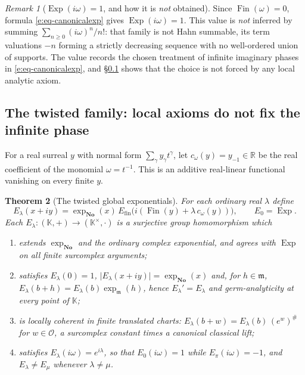 \documentclass[11pt,a4paper]{article}
\numberwithin{equation}{section}
\newtheorem{theorem}{Theorem}[section]
\theoremstyle{definition}
\theoremstyle{remark}
\newtheorem{remark}[theorem]{Remark}
\theoremstyle{plain}
\newcommand{\K}{\mathbb K}
\newcommand{\No}{\mathbf{No}}
\newcommand{\RR}{\mathbb R}
\newcommand{\Ov}{\mathcal O}
\newcommand{\mm}{\mathfrak m}
\DeclareMathOperator{\Exp}{Exp}
\newcommand{\tm}{t}
\newcommand{\ev}[1]{#1^{\#}}
\newcommand{\abs}[1]{\lvert #1\rvert}
\begin{document}
\begin{remark}[$\Exp(i\omega)=1$, and how it is \emph{not} obtained]
\label{e:rem-iomega}
Since $\operatorname{Fin}(\omega)=0$, formula
\eqref{e:eq-canonicalexp} gives $\Exp(i\omega)=1$.  This value is
\emph{not} inferred by summing $\sum_{n\ge0}(i\omega)^n/n!$: that family is
not Hahn summable, its term valuations $-n$ forming a strictly decreasing
sequence with no well-ordered union of supports.  The value records the
chosen treatment of infinite imaginary phases in
\eqref{e:eq-canonicalexp}, and \S\ref{e:sec-twisted} shows that the choice
is not forced by any local analytic axiom.
\end{remark}

\subsection{The twisted family: local axioms do not fix the infinite phase}
\label{e:sec-twisted}

For a real surreal $y$ with normal form $\sum_\gamma y_\gamma\tm^{\gamma}$,
let $c_\omega(y)=y_{-1}\in\RR$ be the real coefficient of the monomial
$\omega=\tm^{-1}$.  This is an additive real-linear functional vanishing on
every finite $y$.

\begin{theorem}[The twisted global exponentials]\label{e:thm-twisted}
For each ordinary real $\lambda$ define
\begin{equation}\label{e:eq-twisted}
 E_\lambda(x+iy)=\exp_{\No}(x)\,
 E_{\mathrm{fin}}\bigl(i(\operatorname{Fin}(y)+\lambda\,c_\omega(y))\bigr),
 \qquad E_0=\Exp .
\end{equation}
Each $E_\lambda:(\K,+)\to(\K^{\times},\cdot)$ is a surjective group
homomorphism which
\begin{enumerate}[label=\textup{(\alph*)}]
\item extends $\exp_{\No}$ and the ordinary complex exponential, and
      agrees with $\Exp$ on \emph{all finite} surcomplex arguments;
\item satisfies $E_\lambda(0)=1$, $\abs{E_\lambda(x+iy)}=\exp_{\No}(x)$
      and, for $h\in\mm$,
      $E_\lambda(b+h)=E_\lambda(b)\exp_{\mm}(h)$, hence
      $E_\lambda'=E_\lambda$ and germ-analyticity at every point of $\K$;
\item is locally coherent in finite translated charts:
      $E_\lambda(b+w)=E_\lambda(b)\,\ev{(e^{w})}$ for $w\in\Ov$, a
      surcomplex constant times a canonical classical lift;
\item satisfies $E_\lambda(i\omega)=e^{i\lambda}$, so that
      $E_0(i\omega)=1$ while $E_\pi(i\omega)=-1$, and $E_\lambda\ne E_\mu$
      whenever $\lambda\ne\mu$.
\end{enumerate}
\end{theorem}
\end{document}
